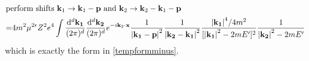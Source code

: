 \documentclass{article}
\newcommand{\vbp}{\vb{p}}
\newcommand{\vbk}{\vb{k}}
\begin{document}
\begin{appendices}
\begin{align*}
		\intertext{perform shifts $\vbk_1\rightarrow\vbk_1-\vbp$ and $\vbk_2\rightarrow\vbk_2-\vbk_1-\vbp$}
		=&4m^2\mu^{2\epsilon}Z^2e^4
		\int\frac{\dd^d\vb{k_1}}{(2\pi)^d}\frac{\dd^d\vb{k_2}}{(2\pi)^d}e^{-i\vbk_2\cdot \vb{x}}\frac{1}{\vb{\abs{k_1-p}}^2}\frac{1}{\vb{\abs{k_2-k_1}}^2}\frac{\vb{\abs{k_1}}^4/4m^2}{[\vb{\abs{k_1}}^2-2mE']^2}\frac{1}{\vb{\abs{k_2}}^2-2mE'}
	\end{align*}
	which is exactly the form in \eqref{tempformminus}.

\end{appendices}




\end{document}
